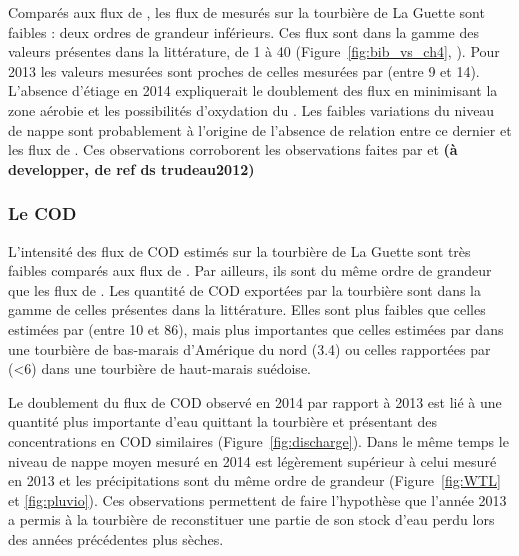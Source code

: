 Comparés aux flux de \coo, les flux de \chh mesurés sur la tourbière de La Guette sont faibles : deux ordres de grandeur inférieurs.
Ces flux sont dans la gamme des valeurs présentes dans la littérature, de 1 à \SI{40}{\gcma} (Figure~\ref{fig:bib_vs_ch4},  \citep{nilsson2001}).
Pour 2013 les valeurs mesurées sont proches de celles mesurées par \citet{nilsson2008} (entre 9 et \SI{14}{\gcma}).
L'absence d'étiage en 2014 expliquerait le doublement des flux en minimisant la zone aérobie et les possibilités d'oxydation du \chh \citep{lai2009}.
Les faibles variations du niveau de nappe sont probablement à l'origine de l'absence de relation entre ce dernier et les flux de \chh.
Ces observations corroborent les observations faites par \citet{trudeau2012} et \textbf{(à developper, de ref ds trudeau2012)}


\subsubsection{Le COD}

L'intensité des flux de COD estimés sur la tourbière de La Guette sont très faibles comparés aux flux de \coo.
Par ailleurs, ils sont du même ordre de grandeur que les flux de \chh.
Les quantité de COD exportées par la tourbière sont dans la gamme de celles présentes dans la littérature.
Elles sont plus faibles que celles estimées par \citet{worrall2009} (entre 10 et \SI{86}{\gcma}), mais plus importantes que celles estimées par \citet{carroll1997} dans une tourbière de bas-marais d’Amérique du nord (\SI{3.4}{\gcma}) ou celles rapportées par \citet{waddington2000} (<\SI{6}{\gcma}) dans une tourbière de haut-marais suédoise.

Le doublement du flux de COD observé en 2014 par rapport à 2013 est lié à une quantité plus importante d'eau quittant la tourbière et présentant des concentrations en COD similaires (Figure~\ref{fig:discharge}).
Dans le même temps le niveau de nappe moyen mesuré en 2014 est légèrement supérieur à celui mesuré en 2013 et les précipitations sont du même ordre de grandeur (Figure~\ref{fig:WTL} et \ref{fig:pluvio}).
Ces observations permettent de faire l'hypothèse que l'année 2013 a permis à la tourbière de reconstituer une partie de son stock d'eau perdu lors des années précédentes plus sèches.



